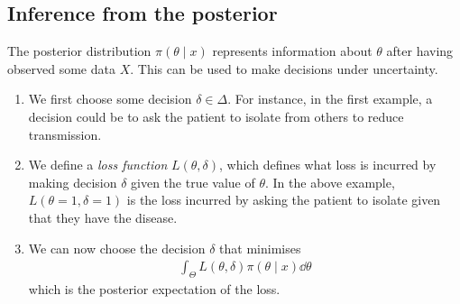 \subsection{Inference from the posterior}
The posterior distribution $\pi(\theta \mid x)$ represents information about $\theta$ after having observed some data $X$.
This can be used to make decisions under uncertainty.
\begin{enumerate}
	\item We first choose some decision $\delta \in \Delta$.
	      For instance, in the first example, a decision could be to ask the patient to isolate from others to reduce transmission.
	\item We define a \textit{loss function} $L(\theta,\delta)$, which defines what loss is incurred by making decision $\delta$ given the true value of $\theta$.
	      In the above example, $L(\theta = 1, \delta = 1)$ is the loss incurred by asking the patient to isolate given that they have the disease.
	\item We can now choose the decision $\delta$ that minimises
	      \begin{align*}
		      \int_\Theta L(\theta, \delta) \pi(\theta \mid x) \dd{\theta}
	      \end{align*}
	      which is the posterior expectation of the loss.
\end{enumerate}

